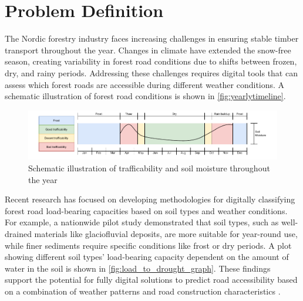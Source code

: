 \section{Problem Definition}
The Nordic forestry industry faces increasing challenges in ensuring stable timber transport throughout the year. Changes in climate have extended the snow-free season, creating variability in forest road conditions due to shifts between frozen, dry, and rainy periods. Addressing these challenges requires digital tools that can assess which forest roads are accessible during different weather conditions. A schematic illustration of forest road conditions is shown in \autoref{fig:yearlytimeline}.

\begin{figure}[h]
    \centering
    \centerline{\includegraphics[width=1.3\linewidth]{figures/yearlytimeline.pdf}}
    \caption{Schematic illustration of trafficability and soil moisture throughout the year}
    \label{fig:yearlytimeline}
\end{figure}

Recent research has focused on developing methodologies for digitally classifying forest road load-bearing capacities based on soil types and weather conditions. For example, a nationwide pilot study demonstrated that soil types, such as well-drained materials like \gls{glaciofluvial deposit}s, are more suitable for year-round use, while finer sediments require specific conditions like frost or dry periods. A plot showing different soil types' load-bearing capacity dependent on the amount of water in the soil is shown in \autoref{fig:load_to_drought_graph}. These findings support the potential for fully digital solutions to predict road accessibility based on a combination of weather patterns and road construction characteristics \cite{fjeld2023trafficability}.

